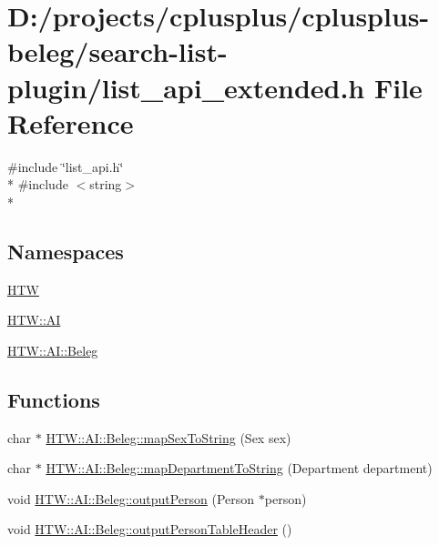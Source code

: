 \hypertarget{search-list-plugin_2list__api__extended_8h}{\section{D\-:/projects/cplusplus/cplusplus-\/beleg/search-\/list-\/plugin/list\-\_\-api\-\_\-extended.h File Reference}
\label{search-list-plugin_2list__api__extended_8h}
}
{\ttfamily \#include \char`\"{}list\-\_\-api.\-h\char`\"{}}\\*
{\ttfamily \#include $<$string$>$}\\*
\subsection*{Namespaces}
\begin{DoxyCompactItemize}
\item 
\hyperlink{namespace_h_t_w}{H\-T\-W}
\item 
\hyperlink{namespace_h_t_w_1_1_a_i}{H\-T\-W\-::\-A\-I}
\item 
\hyperlink{namespace_h_t_w_1_1_a_i_1_1_beleg}{H\-T\-W\-::\-A\-I\-::\-Beleg}
\end{DoxyCompactItemize}
\subsection*{Functions}
\begin{DoxyCompactItemize}
\item 
char $\ast$ \hyperlink{namespace_h_t_w_1_1_a_i_1_1_beleg_aa88237c539d44af6b297104e90f3fe4a}{H\-T\-W\-::\-A\-I\-::\-Beleg\-::map\-Sex\-To\-String} (Sex sex)
\item 
char $\ast$ \hyperlink{namespace_h_t_w_1_1_a_i_1_1_beleg_a71374c8885c328cc86695031048d6f3a}{H\-T\-W\-::\-A\-I\-::\-Beleg\-::map\-Department\-To\-String} (Department department)
\item 
void \hyperlink{namespace_h_t_w_1_1_a_i_1_1_beleg_a0079743a47110e2ebbf1d1c0adc88a4f}{H\-T\-W\-::\-A\-I\-::\-Beleg\-::output\-Person} (Person $\ast$person)
\item 
void \hyperlink{namespace_h_t_w_1_1_a_i_1_1_beleg_a4a69303afeacbd64a2185c148f7b1862}{H\-T\-W\-::\-A\-I\-::\-Beleg\-::output\-Person\-Table\-Header} ()
\end{DoxyCompactItemize}

